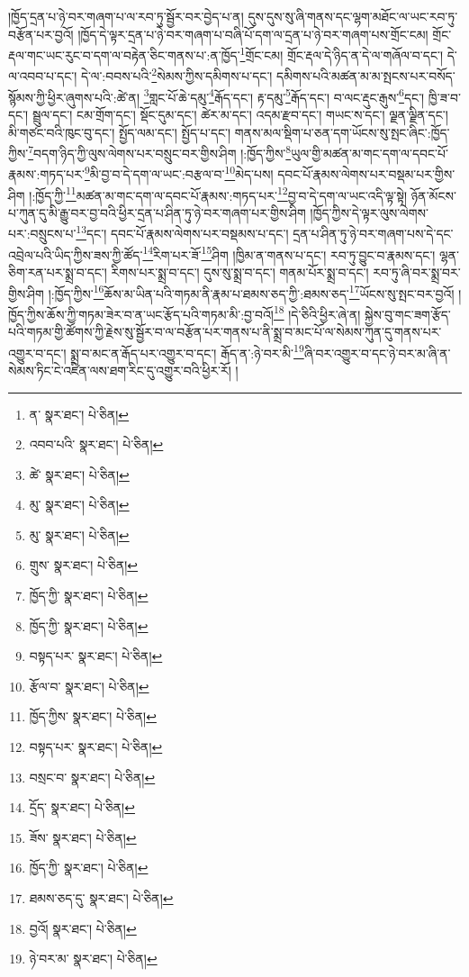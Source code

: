 །ཁྱོད་དྲན་པ་ཉེ་བར་གཞག་པ་ལ་རབ་ཏུ་སྦྱོར་བར་བྱེད་པ་ན། དུས་དུས་སུ་ཞི་གནས་དང་ལྷག་མཐོང་ལ་ཡང་རབ་ཏུ་བརྩོན་པར་བྱའོ། །ཁྱོད་དེ་ལྟར་དྲན་པ་ཉེ་བར་གཞག་པ་བཞི་པོ་དག་ལ་དྲན་པ་ཉེ་བར་གཞག་པས་གྲོང་ངམ། གྲོང་རྡལ་གང་ཡང་རུང་བ་དག་ལ་བརྟེན་ཅིང་གནས་པ་:ན་ཁྱོད་\footnote{ན་  སྣར་ཐང་།  པེ་ཅིན། }གྲོང་ངམ། གྲོང་རྡལ་དེ་ཉིད་ན་དེ་ལ་གཞོལ་བ་དང་། དེ་ལ་འབབ་པ་དང་། དེ་ལ་:བབས་པའི་\footnote{འབབ་པའི་  སྣར་ཐང་།  པེ་ཅིན། }སེམས་ཀྱིས་དམིགས་པ་དང་། དམིགས་པའི་མཚན་མ་མ་སྤངས་པར་བསོད་སྙོམས་ཀྱི་ཕྱིར་ཞུགས་པའི་:ཚེ་ན། \footnote{ཚེ་  སྣར་ཐང་།  པེ་ཅིན། }གླང་པོ་ཆེ་དམུ་\footnote{མུ་  སྣར་ཐང་།  པེ་ཅིན། }རྒོད་དང་། རྟ་དམུ་\footnote{མུ་  སྣར་ཐང་།  པེ་ཅིན། }རྒོད་དང་། བ་ལང་རྡུང་རྒུས་\footnote{གྲུས་  སྣར་ཐང་།  པེ་ཅིན། }དང་། ཁྱི་ཟ་བ་དང་། སྦྲུལ་དང་། ངམ་གྲོག་དང་། སྡོང་དུམ་དང་། ཚེར་མ་དང་། འདམ་རྫབ་དང་། གཡང་ས་དང་། ལྗན་ལྗིན་དང་། མི་གཙང་བའི་ཁུང་བུ་དང་། སྤྱོད་ལམ་དང་། སྤྱོད་པ་དང་། གནས་མལ་སྡིག་པ་ཅན་དག་ཡོངས་སུ་སྤང་ཞིང་:ཁྱོད་ཀྱིས་\footnote{ཁྱོད་ཀྱི་  སྣར་ཐང་།  པེ་ཅིན། }བདག་ཉིད་ཀྱི་ལུས་ལེགས་པར་བསྲུང་བར་གྱིས་ཤིག །:ཁྱོད་ཀྱིས་\footnote{ཁྱོད་ཀྱི་  སྣར་ཐང་།  པེ་ཅིན། }ཡུལ་གྱི་མཚན་མ་གང་དག་ལ་དབང་པོ་རྣམས་:གཏད་པར་\footnote{བསྟད་པར་  སྣར་ཐང་།  པེ་ཅིན། }མི་བྱ་བ་དེ་དག་ལ་ཡང་:བརྩལ་བ་\footnote{རྩོལ་བ་  སྣར་ཐང་།  པེ་ཅིན། }མེད་པས། དབང་པོ་རྣམས་ལེགས་པར་བསྡམ་པར་གྱིས་ཤིག །:ཁྱོད་ཀྱི་\footnote{ཁྱོད་ཀྱིས་  སྣར་ཐང་།  པེ་ཅིན། }མཚན་མ་གང་དག་ལ་དབང་པོ་རྣམས་:གཏད་པར་\footnote{བསྟད་པར་  སྣར་ཐང་།  པེ་ཅིན། }བྱ་བ་དེ་དག་ལ་ཡང་འདི་ལྟ་སྟེ། ཉོན་མོངས་པ་ཀུན་དུ་མི་རྒྱུ་བར་བྱ་བའི་ཕྱིར་དྲན་པ་ཤིན་ཏུ་ཉེ་བར་གཞག་པར་གྱིས་ཤིག །ཁྱོད་ཀྱིས་དེ་ལྟར་ལུས་ལེགས་པར་:བསྲུངས་པ་\footnote{བསྲང་བ་  སྣར་ཐང་།  པེ་ཅིན། }དང་། དབང་པོ་རྣམས་ལེགས་པར་བསྡམས་པ་དང་། དྲན་པ་ཤིན་ཏུ་ཉེ་བར་གཞག་པས་དེ་དང་འབྲེལ་པའི་ཡིད་ཀྱིས་ཟས་ཀྱི་ཚོད་\footnote{དྲོད་  སྣར་ཐང་།  པེ་ཅིན། }རིག་པར་ཟོ་\footnote{ཟོས་  སྣར་ཐང་།  པེ་ཅིན། }ཤིག །ཁྱིམ་ན་གནས་པ་དང་། རབ་ཏུ་བྱུང་བ་རྣམས་དང་། ལྷན་ཅིག་རན་པར་སྨྲ་བ་དང་། རིགས་པར་སྨྲ་བ་དང་། དུས་སུ་སྨྲ་བ་དང་། གནམ་པོར་སྨྲ་བ་དང་། རབ་ཏུ་ཞི་བར་སྨྲ་བར་གྱིས་ཤིག །:ཁྱོད་ཀྱིས་\footnote{ཁྱོད་ཀྱི་  སྣར་ཐང་།  པེ་ཅིན། }ཆོས་མ་ཡིན་པའི་གཏམ་ནི་རྣམ་པ་ཐམས་ཅད་ཀྱི་:ཐམས་ཅད་\footnote{ཐམས་ཅད་དུ་  སྣར་ཐང་།  པེ་ཅིན། }ཡོངས་སུ་སྤང་བར་བྱའོ། །ཁྱོད་ཀྱིས་ཆོས་ཀྱི་གཏམ་ཟེར་བ་ན་ཡང་རྩོད་པའི་གཏམ་མི་:བྱ་བའོ།\footnote{བྱའོ།  སྣར་ཐང་།  པེ་ཅིན། } །དེ་ཅིའི་ཕྱིར་ཞེ་ན། སྐྱེས་བུ་གང་ཟག་རྩོད་པའི་གཏམ་གྱི་ཚོགས་ཀྱི་རྗེས་སུ་སྦྱོར་བ་ལ་བརྩོན་པར་གནས་པ་ནི་སྨྲ་བ་མང་པོ་ལ་སེམས་ཀུན་དུ་གནས་པར་འགྱུར་བ་དང་། སྨྲ་བ་མང་ན་རྒོད་པར་འགྱུར་བ་དང་། རྒོད་ན་:ཉེ་བར་མི་\footnote{ཉེ་བར་མ་  སྣར་ཐང་།  པེ་ཅིན། }ཞི་བར་འགྱུར་བ་དང་ཉེ་བར་མ་ཞི་ན་སེམས་ཏིང་ངེ་འཛིན་ལས་ཐག་རིང་དུ་འགྱུར་བའི་ཕྱིར་རོ། །

